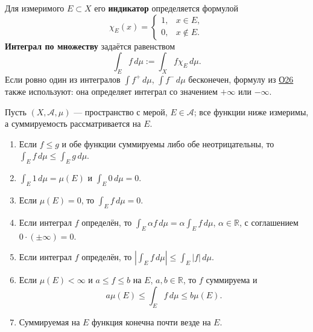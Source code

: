 \label{ticket:28}

\begin{definition}
Для измеримого $E\subset X$ его \textbf{индикатор} определяется формулой
\[
  \chi_E(x)=\begin{cases}1,&x\in E,\\0,&x\notin E.\end{cases}
\]
\textbf{Интеграл по множеству} задаётся равенством
\[
  \int_E f\,d\mu:=\int_X f\chi_E\,d\mu.
\]
Если ровно один из интегралов $\int f^+\,d\mu$, $\int f^-\,d\mu$ бесконечен, формулу из \hyperref[definition:26]{О26} также используют: она определяет интеграл со значением $+\infty$ или $-\infty$.
\end{definition}

\begin{theorem}
Пусть $(X,\mathcal A,\mu)$ --- пространство с мерой, $E\in\mathcal A$; все функции ниже измеримы, а суммируемость рассматривается на $E$.
\begin{enumerate}
  \item Если $f\le g$ и обе функции суммируемы либо обе неотрицательны, то $\int_E f\,d\mu\le\int_E g\,d\mu$.
  \item $\int_E1\,d\mu=\mu(E)$ и $\int_E0\,d\mu=0$.
  \item Если $\mu(E)=0$, то $\int_E f\,d\mu=0$.
  \item Если интеграл $f$ определён, то $\int_E\alpha f\,d\mu=\alpha\int_E f\,d\mu$, $\alpha\in\mathbb R$, с соглашением $0\cdot(\pm\infty)=0$.
  \item Если интеграл $f$ определён, то $|\int_E f\,d\mu|\le\int_E|f|\,d\mu$.
  \item Если $\mu(E)<\infty$ и $a\le f\le b$ на $E$, $a,b\in\mathbb R$, то $f$ суммируема и
  \[
    a\mu(E)\le\int_E f\,d\mu\le b\mu(E).
  \]
  \item Суммируемая на $E$ функция конечна почти везде на $E$.
\end{enumerate}
\end{theorem}

